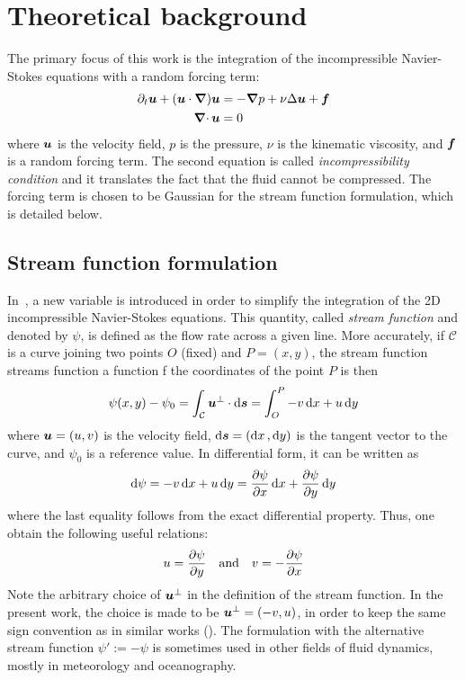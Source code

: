 \documentclass[../main.tex]{subfiles}
\begin{document}
\section{Theoretical background}
The primary focus of this work is the integration of the incompressible Navier-Stokes equations with a random forcing term:
\begin{align}
	\label{eq:navier-stokes}\partial_t \boldsymbol{u} + (\boldsymbol{u} \cdot \grad) \boldsymbol{u} & = -\grad p + \nu\Delta \boldsymbol{u} + \boldsymbol{f} \\
	\label{eq:incompressibility}\operatorname{\boldsymbol{\nabla}\cdot}{\boldsymbol{u}}                               & = 0
\end{align}
where $\boldsymbol{u}$ is the velocity field, $p$ is the pressure, $\nu$ is the kinematic viscosity, and $\boldsymbol{f}$ is a random forcing term. The second equation is called	\emph{incompressibility condition} and it translates the fact that the fluid cannot be compressed.
The forcing term is chosen to be Gaussian for the stream function formulation, which is detailed below.

\subsection{Stream function formulation}
In~\cite{Batchelor2000}, a new variable is introduced in order to simplify the integration of the 2D incompressible Navier-Stokes equations. This quantity, called \emph{stream function} and denoted by $\psi$, is defined as the flow rate across a given line. More accurately, if $\mathcal{C}$ is a curve joining two points $O$ (fixed) and $P=(x,y)$, the stream function streams function a function f the coordinates of the point $P$ is then
\begin{equation}
	\psi(x,y) -\psi_0 = \int_{\mathcal{C}} \boldsymbol{u}^\perp \cdot \dd{\boldsymbol{s}}= \int_{O}^{P} -v \dd{x} + u \dd{y}
\end{equation}
where $\boldsymbol{u} = (u,v)$ is the velocity field, $\dd{\boldsymbol{s}}=(\dd{x},\dd{y})$ is the tangent vector to the curve, and $\psi_0$ is a reference value. In differential form, it can be written as
\begin{equation}
	\dd{\psi} = -v \dd{x} + u \dd{y} = \pdv{\psi}{x} \dd{x} + \pdv{\psi}{y} \dd{y}
\end{equation}
where the last equality follows from the exact differential property. Thus, one obtain the following useful relations:
\begin{equation}
	u = \pdv{\psi}{y} \quad \text{and} \quad v = -\pdv{\psi}{x}
\end{equation}
Note the arbitrary choice of $\boldsymbol{u}^\perp$ in the definition of the stream function. In the present work, the choice is made to be $\boldsymbol{u}^\perp = (-v,u)$, in order to keep the same sign convention as in similar works (\cite{2dturbulence,alexakisLONG}). The formulation with the alternative stream function $\psi':=-\psi$ is sometimes used in other fields of fluid dynamics, mostly in meteorology and oceanography.
\end{document}
